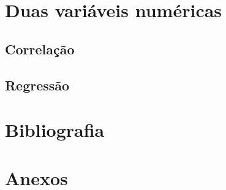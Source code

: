 \documentclass[
  letterpaper,
  DIV=11,
  numbers=noendperiod]{scrreprt}
\newlength{\cslhangindent}
\newenvironment{CSLReferences}[2] %
 {\begin{list}{}{%
  \setlength{\itemindent}{0pt}
  \setlength{\leftmargin}{0pt}
  \setlength{\parsep}{0pt}
  \ifodd #1
   \setlength{\leftmargin}{\cslhangindent}
   \setlength{\itemindent}{-1\cslhangindent}
  \fi
  \setlength{\itemsep}{#2\baselineskip}}}
 {\end{list}}
\begin{document}
\chapter{Duas variáveis numéricas}\label{duas-variuxe1veis-numuxe9ricas}

\section{Correlação}\label{correlauxe7uxe3o}

\section{Regressão}\label{regressuxe3o}


\chapter*{Bibliografia}\label{bibliografia}


\label{refs}
\begin{CSLReferences}{0}{1}
\end{CSLReferences}


\chapter*{Anexos}\label{anexos}

\end{document}

